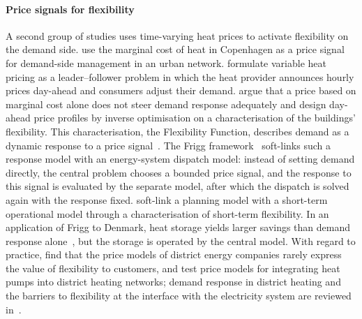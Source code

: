 \paragraph{Price signals for flexibility}
A second group of studies uses time-varying heat prices to activate flexibility on the demand side. \citet{cai2018demand} use the marginal cost of heat in Copenhagen as a price signal for demand-side management in an urban network. \citet{bai2022variable} formulate variable heat pricing as a leader--follower problem in which the heat provider announces hourly prices day-ahead and consumers adjust their demand. \citet{mokhtari2025dynamic} argue that a price based on marginal cost alone does not steer demand response adequately and design day-ahead price profiles by inverse optimisation on a characterisation of the buildings' flexibility. This characterisation, the Flexibility Function, describes demand as a dynamic response to a price signal~\cite{junker2018characterizing,junker2020stochastic}. The Frigg framework~\cite{schledorn2022a,schledorn2024frigg} soft-links such a response model with an energy-system dispatch model: instead of setting demand directly, the central problem chooses a bounded price signal, and the response to this signal is evaluated by the separate model, after which the dispatch is solved again with the response fixed. \citet{dominkovic2020implementing} soft-link a planning model with a short-term operational model through a characterisation of short-term flexibility. In an application of Frigg to Denmark, heat storage yields larger savings than demand response alone~\cite{schledorn2024frigg}, but the storage is operated by the central model. With regard to practice, \citet{selvakkumaran2021business} find that the price models of district energy companies rarely express the value of flexibility to customers, and \citet{lygnerud2024capturing} test price models for integrating heat pumps into district heating networks; demand response in district heating and the barriers to flexibility at the interface with the electricity system are reviewed in~\cite{guelpa2021demand,sneum2021barriers}.

